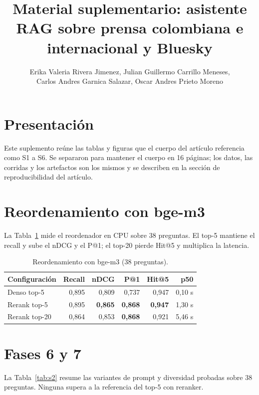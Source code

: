 \documentclass[journal]{IEEEtran}
\begin{document}
\title{Material suplementario: asistente RAG sobre prensa colombiana e internacional y Bluesky}
\author{Erika Valeria Rivera Jimenez, Julian Guillermo Carrillo Meneses,\\
Carlos Andres Garnica Salazar, Oscar Andres Prieto Moreno}

\maketitle

\section*{Presentaci\'on}

Este suplemento re\'une las tablas y figuras que el cuerpo del art\'iculo referencia como S1 a S6. Se separaron para mantener el cuerpo en 16 p\'aginas; los datos, las corridas y los artefactos son los mismos y se describen en la secci\'on de reproducibilidad del art\'iculo.

\section*{Reordenamiento con bge-m3}

La Tabla~\ref{tab:s1} mide el reordenador en CPU sobre 38 preguntas. El top-5 mantiene el recall y sube el nDCG y el P@1; el top-20 pierde Hit@5 y multiplica la latencia.

\begin{table}[H]
\centering
\footnotesize
\caption{Reordenamiento con bge-m3 (38 preguntas).}
\label{tab:s1}
\begin{tabular}{lrrrrr}
\toprule
Configuraci\'on & Recall & nDCG & P@1 & Hit@5 & p50 \\
\midrule
Denso top-5 & 0,895 & 0,809 & 0,737 & 0,947 & 0,10 s \\
Rerank top-5 & 0,895 & \textbf{0,865} & \textbf{0,868} & \textbf{0,947} & 1,30 s \\
Rerank top-20 & 0,864 & 0,853 & \textbf{0,868} & 0,921 & 5,46 s \\
\bottomrule
\end{tabular}
\end{table}

\section*{Fases 6 y 7}

La Tabla~\ref{tab:s2} resume las variantes de prompt y diversidad probadas sobre 38 preguntas. Ninguna supera a la referencia del top-5 con reranker.
\end{document}
